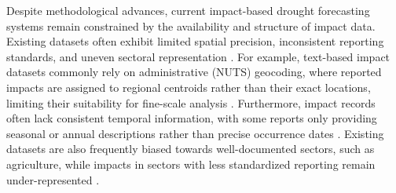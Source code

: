 Despite methodological advances, current impact-based drought forecasting systems remain constrained by the availability and structure of impact data. Existing datasets often exhibit limited spatial precision, inconsistent reporting standards, and uneven sectoral representation \cite{Shyrokaya2024Advances, Bulut2026Framework}. For example, text-based impact datasets commonly rely on administrative (NUTS) geocoding, where reported impacts are assigned to regional centroids rather than their exact locations, limiting their suitability for fine-scale analysis \cite{sodoge2023}. Furthermore, impact records often lack consistent temporal information, with some reports only providing seasonal or annual descriptions rather than precise occurrence dates \cite{Bulut2026Framework, Sutanto2019Moving}. Existing datasets are also frequently biased towards well-documented sectors, such as agriculture, while impacts in sectors with less standardized reporting remain under-represented \cite{Shyrokaya2024Advances}.
